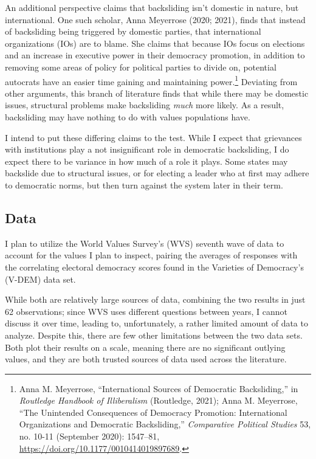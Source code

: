 \documentclass[
  letterpaper,
  DIV=11,
  numbers=noendperiod]{scrartcl}
\begin{document}
An additional perspective claims that backsliding isn't domestic in
nature, but international. One such scholar, Anna Meyerrose (2020;
2021), finds that instead of backsliding being triggered by domestic
parties, that international organizations (IOs) are to blame. She claims
that because IOs focus on elections and an increase in executive power
in their democracy promotion, in addition to removing some areas of
policy for political parties to divide on, potential autocrats have an
easier time gaining and maintaining power.\footnote{Anna M. Meyerrose,
  {``International {Sources} of {Democratic Backsliding},''} in
  \emph{Routledge {Handbook} of {Illiberalism}} (Routledge, 2021); Anna
  M. Meyerrose, {``The {Unintended Consequences} of {Democracy
  Promotion}: {International Organizations} and {Democratic
  Backsliding},''} \emph{Comparative Political Studies} 53, no. 10-11
  (September 2020): 1547--81,
  \url{https://doi.org/10.1177/0010414019897689}.} Deviating from other
arguments, this branch of literature finds that while there may be
domestic issues, structural problems make backsliding \emph{much} more
likely. As a result, backsliding may have nothing to do with values
populations have.

I intend to put these differing claims to the test. While I expect that
grievances with institutions play a not insignificant role in democratic
backsliding, I do expect there to be variance in how much of a role it
plays. Some states may backslide due to structural issues, or for
electing a leader who at first may adhere to democratic norms, but then
turn against the system later in their term.

\subsection{Data}\label{data}

I plan to utilize the World Values Survey's (WVS) seventh wave of data
to account for the values I plan to inspect, pairing the averages of
responses with the correlating electoral democracy scores found in the
Varieties of Democracy's (V-DEM) data set.

While both are relatively large sources of data, combining the two
results in just 62 observations; since WVS uses different questions
between years, I cannot discuss it over time, leading to, unfortunately,
a rather limited amount of data to analyze. Despite this, there are few
other limitations between the two data sets. Both plot their results on
a scale, meaning there are no significant outlying values, and they are
both trusted sources of data used across the literature.
\end{document}
